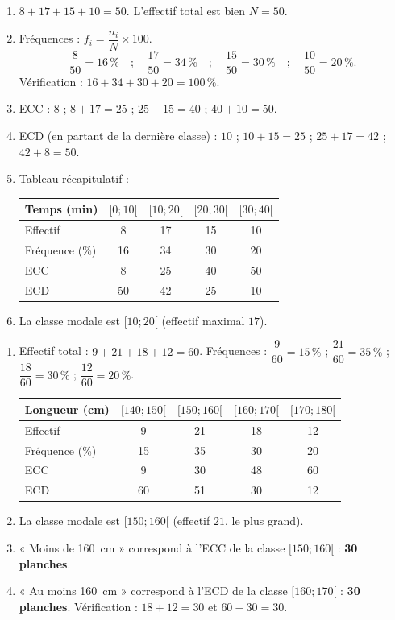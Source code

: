 \documentclass[11pt]{article}
\begin{document}
\begin{corrige}
\begin{enumerate}
\item $8+17+15+10=50$. L'effectif total est bien $N=50$.
\item Fréquences : $f_i=\dfrac{n_i}{N}\times 100$.
\[ \frac{8}{50}=16\,\% \quad ; \quad \frac{17}{50}=34\,\% \quad ; \quad \frac{15}{50}=30\,\% \quad ; \quad \frac{10}{50}=20\,\%. \]
Vérification : $16+34+30+20=100\,\%$.
\item ECC : $8$ ; $8+17=25$ ; $25+15=40$ ; $40+10=50$.
\item ECD (en partant de la dernière classe) : $10$ ; $10+15=25$ ; $25+17=42$ ; $42+8=50$.
\item Tableau récapitulatif :
\begin{center}
\begin{tabular}{|l|c|c|c|c|}
\hline
Temps (min) & $[0 ; 10[$ & $[10 ; 20[$ & $[20 ; 30[$ & $[30 ; 40[$ \\
\hline
Effectif & 8 & 17 & 15 & 10 \\
\hline
Fréquence (\%) & 16 & 34 & 30 & 20 \\
\hline
ECC & 8 & 25 & 40 & 50 \\
\hline
ECD & 50 & 42 & 25 & 10 \\
\hline
\end{tabular}
\end{center}
\item La classe modale est $[10 ; 20[$ (effectif maximal $17$).
\end{enumerate}
\end{corrige}

\begin{corrige}
\begin{enumerate}
\item Effectif total : $9+21+18+12=60$. Fréquences : $\dfrac{9}{60}=15\,\%$ ; $\dfrac{21}{60}=35\,\%$ ; $\dfrac{18}{60}=30\,\%$ ; $\dfrac{12}{60}=20\,\%$.
\begin{center}
\begin{tabular}{|l|c|c|c|c|}
\hline
Longueur (cm) & $[140 ; 150[$ & $[150 ; 160[$ & $[160 ; 170[$ & $[170 ; 180[$ \\
\hline
Effectif & 9 & 21 & 18 & 12 \\
\hline
Fréquence (\%) & 15 & 35 & 30 & 20 \\
\hline
ECC & 9 & 30 & 48 & 60 \\
\hline
ECD & 60 & 51 & 30 & 12 \\
\hline
\end{tabular}
\end{center}
\item La classe modale est $[150 ; 160[$ (effectif $21$, le plus grand).
\item « Moins de \SI{160}{cm} » correspond à l'ECC de la classe $[150 ; 160[$ : \textbf{30 planches}.
\item « Au moins \SI{160}{cm} » correspond à l'ECD de la classe $[160 ; 170[$ : \textbf{30 planches}. Vérification : $18+12=30$ et $60-30=30$.
\end{enumerate}
\end{corrige}
\end{document}
